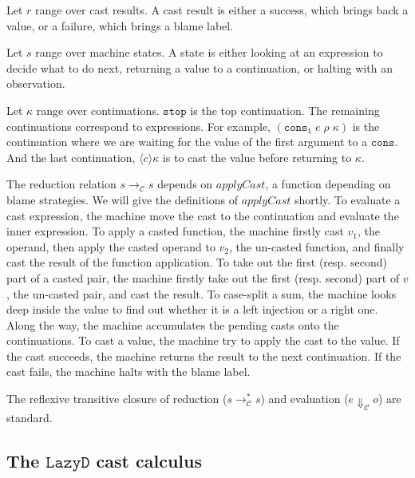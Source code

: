 \documentclass[acmsmall,review,anonymous]{acmart}\settopmatter{printfolios=true,printccs=false,printacmref=false}
\newcommand{\lazyD}{$\mathtt{Lazy D}$}
\newcommand{\judgeCreduce}[2]{#1 \longrightarrow_{\mathcal{C}} #2}
\newcommand{\judgeCreduceTrans}[2]{#1 \longrightarrow_{\mathcal{C}}^{*} #2}
\newcommand{\judgeCeval}[2]{#1 \Downarrow_{\mathcal{C}} #2}
\begin{document}
Let $ r $ range over cast results. A cast result is either a success, which 
brings back a value, or a failure, which brings a blame label.

Let $ s $ range over machine states. A state is either looking at an 
expression to decide what to do next, returning a value to a continuation, or 
halting with an observation.

Let $ \kappa $ range over continuations. $ \mathtt{stop} $ is the top 
continuation. The remaining continuations correspond to expressions. For 
example, $ (\mathtt{cons_1} \; e \; \rho \; \kappa) $ is the continuation where 
we are waiting for the value of the first argument to a $ \mathtt{cons} $. And 
the last continuation, $ \langle c \rangle \kappa $ is to cast the value before 
returning to $ \kappa $.

The reduction relation $ \judgeCreduce{s}{s} $ depends on $ applyCast $, a 
function depending on blame strategies. We will give the definitions of $ 
applyCast $ shortly.
To evaluate a cast 
expression, the machine move the 
cast to the continuation and evaluate the inner expression. To apply a casted 
function, the machine firstly cast $ v_1 $, the operand, then apply the casted 
operand to $ v_2 $, the un-casted function, and finally cast the result of the 
function application. To take out the first (resp. second) part of a casted 
pair, the machine firstly take out the first (resp. second) part of $ v $, the 
un-casted pair, and cast the result. To case-split a sum, the machine looks 
deep inside the value to find out whether it is a left injection or a right 
one.
Along the way, the machine accumulates the pending casts onto the 
continuations. To cast a value, the machine try to apply the cast to the value. 
If the cast succeeds, the machine returns the result to the next continuation. 
If the cast fails, the machine halts with the blame label.

The reflexive transitive closure of reduction ($ \judgeCreduceTrans{s}{s} $) 
and evaluation ($ \judgeCeval{e}{o} $) are standard.

\subsection{The \lazyD{} cast calculus}
\end{document}
